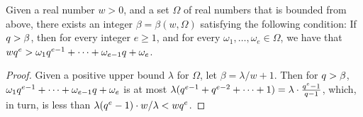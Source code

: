 \documentclass{amsart}
\begin{document}
%
%
%

\begin{lemma}
   \label{positive-polynomial: L}
   Given a real number $w > 0$, and a set $\Omega$ of real numbers that is bounded from above, there exists an integer $\beta = \beta(w, \Omega)$ satisfying the following condition\textup:
   If $q > \beta$, then for every integer $e \geq 1$, and for every $\omega_1, \ldots, \omega_e \in \Omega$, we have that $wq^{e} >  \omega_1 q^{e-1} + \cdots + \omega_{e-1} q + \omega_e$.
\end{lemma}

\begin{proof}
   Given a positive upper bound $\lambda$ for $\Omega$, let $\beta = \lambda/w  + 1$.
   Then for $q>\beta$, $\omega_1 q^{e-1} + \cdots + \omega_{e-1}  q + \omega_e$ is at most $\lambda(q^{e-1} + q^{e-2} + \cdots + 1) = \lambda \cdot \frac{q^e-1}{q-1}$, which, in turn, is less than $\lambda (q^e-1) \cdot w/\lambda < w q^e$.
\end{proof}
\end{document}
